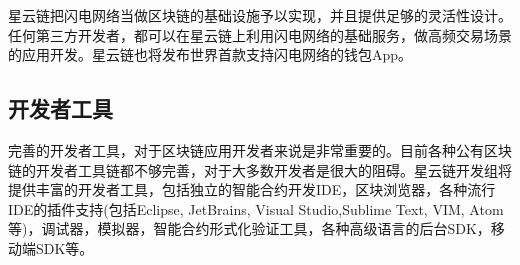 星云链把闪电网络当做区块链的基础设施予以实现，并且提供足够的灵活性设计。任何第三方开发者，都可以在星云链上利用闪电网络的基础服务，做高频交易场景的应用开发。星云链也将发布世界首款支持闪电网络的钱包App。

\subsection{开发者工具}
完善的开发者工具，对于区块链应用开发者来说是非常重要的。目前各种公有区块链的开发者工具链都不够完善，对于大多数开发者是很大的阻碍。星云链开发组将提供丰富的开发者工具，包括独立的智能合约开发IDE，区块浏览器，各种流行IDE的插件支持(包括Eclipse, JetBrains, Visual Studio,Sublime Text, VIM, Atom等)，调试器，模拟器，智能合约形式化验证工具，各种高级语言的后台SDK，移动端SDK等。
